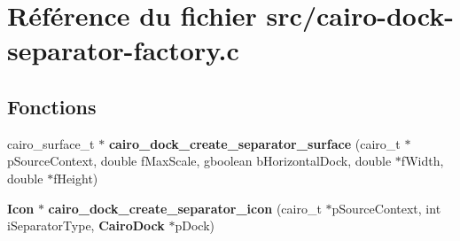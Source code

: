 \section{R\'{e}f\'{e}rence du fichier src/cairo-dock-separator-factory.c}
\label{cairo-dock-separator-factory_8c}
\subsection*{Fonctions}
\begin{CompactItemize}
\item 
cairo\_\-surface\_\-t $\ast$ {\bf cairo\_\-dock\_\-create\_\-separator\_\-surface} (cairo\_\-t $\ast$p\-Source\-Context, double f\-Max\-Scale, gboolean b\-Horizontal\-Dock, double $\ast$f\-Width, double $\ast$f\-Height)
\item 
{\bf Icon} $\ast$ {\bf cairo\_\-dock\_\-create\_\-separator\_\-icon} (cairo\_\-t $\ast$p\-Source\-Context, int i\-Separator\-Type, {\bf Cairo\-Dock} $\ast$p\-Dock)
\end{CompactItemize}
